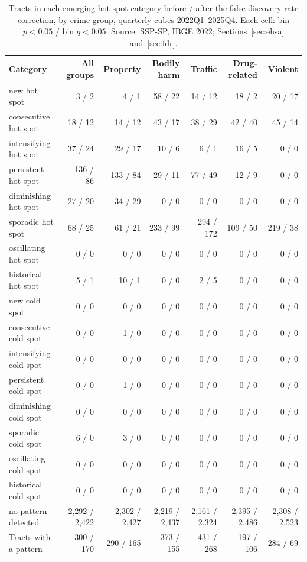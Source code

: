\begin{table}[!ht]
\caption{Tracts in each emerging hot spot category before / after the false discovery rate correction, by crime group, quarterly cubes 2022Q1--2025Q4. Each cell: bin $p < 0.05$ / bin $q < 0.05$. Source: SSP-SP, IBGE 2022; Sections~\ref{sec:ehsa} and~\ref{sec:fdr}.}
\label{tab:ehsafdr}
\centering\scriptsize
\begin{tabular}{@{}lrrrrrr@{}}
\hline\hline
Category & All groups & Property & Bodily harm & Traffic & Drug-related & Violent \\
\hline
new hot spot & 3 / 2 & 4 / 1 & 58 / 22 & 14 / 12 & 18 / 2 & 20 / 17 \\
consecutive hot spot & 18 / 12 & 14 / 12 & 43 / 17 & 38 / 29 & 42 / 40 & 45 / 14 \\
intensifying hot spot & 37 / 24 & 29 / 17 & 10 / 6 & 6 / 1 & 16 / 5 & 0 / 0 \\
persistent hot spot & 136 / 86 & 133 / 84 & 29 / 11 & 77 / 49 & 12 / 9 & 0 / 0 \\
diminishing hot spot & 27 / 20 & 34 / 29 & 0 / 0 & 0 / 0 & 0 / 0 & 0 / 0 \\
sporadic hot spot & 68 / 25 & 61 / 21 & 233 / 99 & 294 / 172 & 109 / 50 & 219 / 38 \\
oscillating hot spot & 0 / 0 & 0 / 0 & 0 / 0 & 0 / 0 & 0 / 0 & 0 / 0 \\
historical hot spot & 5 / 1 & 10 / 1 & 0 / 0 & 2 / 5 & 0 / 0 & 0 / 0 \\
new cold spot & 0 / 0 & 0 / 0 & 0 / 0 & 0 / 0 & 0 / 0 & 0 / 0 \\
consecutive cold spot & 0 / 0 & 1 / 0 & 0 / 0 & 0 / 0 & 0 / 0 & 0 / 0 \\
intensifying cold spot & 0 / 0 & 0 / 0 & 0 / 0 & 0 / 0 & 0 / 0 & 0 / 0 \\
persistent cold spot & 0 / 0 & 1 / 0 & 0 / 0 & 0 / 0 & 0 / 0 & 0 / 0 \\
diminishing cold spot & 0 / 0 & 0 / 0 & 0 / 0 & 0 / 0 & 0 / 0 & 0 / 0 \\
sporadic cold spot & 6 / 0 & 3 / 0 & 0 / 0 & 0 / 0 & 0 / 0 & 0 / 0 \\
oscillating cold spot & 0 / 0 & 0 / 0 & 0 / 0 & 0 / 0 & 0 / 0 & 0 / 0 \\
historical cold spot & 0 / 0 & 0 / 0 & 0 / 0 & 0 / 0 & 0 / 0 & 0 / 0 \\
no pattern detected & 2,292 / 2,422 & 2,302 / 2,427 & 2,219 / 2,437 & 2,161 / 2,324 & 2,395 / 2,486 & 2,308 / 2,523 \\
\hline
Tracts with a pattern & 300 / 170 & 290 / 165 & 373 / 155 & 431 / 268 & 197 / 106 & 284 / 69 \\
\hline\hline
\end{tabular}
\end{table}
